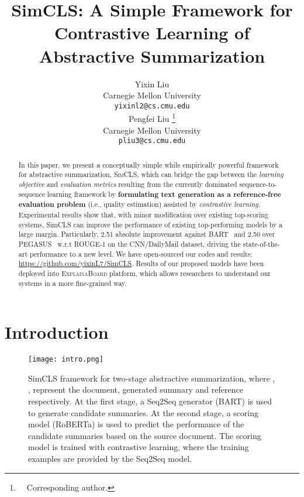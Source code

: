 \documentclass[11pt,a4paper]{article}
\title{{SimCLS}: A Simple Framework for \\Contrastive Learning of Abstractive Summarization}
\author{Yixin Liu \\
  Carnegie Mellon University \\
  \texttt{yixinl2@cs.cmu.edu} \\\And
  Pengfei Liu \thanks{\ \  Corresponding author.}\\
  Carnegie Mellon University \\
  \texttt{pliu3@cs.cmu.edu} \\}
\date{}
\begin{document}
\maketitle
\begin{abstract}

In this paper, we present a conceptually simple while empirically powerful framework for abstractive summarization,  \textsc{SimCLS}, which can bridge the gap between the \textit{learning objective} and \textit{evaluation metrics} resulting from the currently dominated sequence-to-sequence learning framework by \textbf{formulating text generation as a reference-free evaluation problem} (i.e., quality estimation) assisted by \textit{contrastive learning}.
Experimental results show that, with minor modification over existing top-scoring systems, SimCLS can improve the performance of existing top-performing models by a large margin.
Particularly,  2.51 absolute improvement against BART~\citep{lewis-etal-2020-bart} and 2.50 over PEGASUS~\citep{zhang2020pegasus} w.r.t ROUGE-1 on the CNN/DailyMail dataset, driving the state-of-the-art performance to a new level.
We have open-sourced our codes and results: \url{https://github.com/yixinL7/SimCLS}.
Results of our proposed models have been deployed into \textsc{ExplainaBoard} \cite{liu2021explainaboard} platform, which allows researchers to understand our systems in a more fine-grained way.
\end{abstract}

\section{Introduction}

\begin{figure}[t!]
    \centering
    \texttt{[image: intro.png]}
    \caption{SimCLS framework for two-stage abstractive summarization, where , ,  represent the document, generated summary and reference respectively.  At the first stage, a Seq2Seq generator (BART) is used to generate candidate summaries. At the second stage, a scoring model (RoBERTa) is used to predict the performance of the candidate summaries based on the source document. The scoring model is trained with contrastive learning, where the training examples are provided by the Seq2Seq model.}
    \label{fig:intro}
\end{figure}
\end{document}
